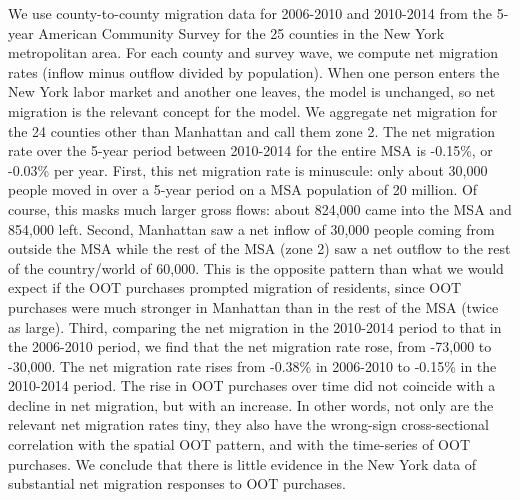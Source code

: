 \documentclass[letterpaper,12pt,dvipsnames,usenames]{article}
\theoremstyle{definition}
\begin{document}
\begin{spacing}{1.0}
\begin{small}
We use county-to-county migration data for 2006-2010 and 2010-2014 from the 5-year American Community Survey for the 25 counties in the New York metropolitan area. For each county and survey wave, we compute net migration rates (inflow minus outflow divided by population). When one person enters the New York labor market and another one leaves, the model is unchanged, so net migration is the relevant concept for the model. We aggregate net migration for the 24 counties other than Manhattan and call them zone 2. The net migration rate over the 5-year period between 2010-2014 for the entire MSA is -0.15\%, or -0.03\% per year. First, this net migration rate is minuscule: only about 30,000 people moved in over a 5-year period on a MSA population of 20 million. Of course, this masks much larger gross flows: about 824,000 came into the MSA and 854,000 left. Second, Manhattan saw a net inflow of 30,000 people coming from outside the MSA while the rest of the MSA (zone 2) saw a net outflow to the rest of the country/world of 60,000. This is the opposite pattern than what we would expect if the OOT purchases prompted migration of residents, since OOT purchases were much stronger in Manhattan than in the rest of the MSA (twice as large). Third, comparing the net migration in the 2010-2014 period to that in the 2006-2010 period, we find that the net migration rate rose, from -73,000 to -30,000. The net migration rate rises from -0.38\% in 2006-2010 to -0.15\% in the 2010-2014 period. The rise in OOT purchases over time did not coincide with a decline in net migration, but with an increase. In other words, not only are the relevant net migration rates tiny, they also have the wrong-sign cross-sectional correlation with the spatial OOT pattern, and with the time-series of OOT purchases. We conclude that there is little evidence in the New York data of substantial net migration responses to OOT purchases.


\end{small}
\end{spacing}
\end{document}
